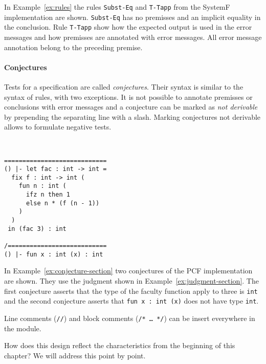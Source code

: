 In Example~\ref{ex:rules} the rules \verb|Subst-Eq| and \verb|T-Tapp|
from the SystemF  implementation are
shown. \verb|Subst-Eq| has no premisses and an implicit equality in
the conclusion. Rule \verb|T-Tapp| show how the expected output is
used in the error messages and how premisses are annotated with error
messages. All error message annotation belong to the preceding
premise.

\paragraph{Conjectures} Tests for a specification are called
\textit{conjectures}. Their syntax is similar to the syntax of rules,
with two exceptions. It is not possible to annotate premisses or
conclusions with error messages and a conjecture can be marked as
\textit{not derivable} by prepending the separating line with a
slash. Marking conjectures not derivable allows to formulate negative
tests.

\begin{example}{~}
\begin{lstlisting}[language=sltc]
============================
() |- let fac : int -> int = 
  fix f : int -> int (
    fun n : int (
      ifz n then 1 
      else n * (f (n - 1))
    )
  )
 in (fac 3) : int

/===========================
() |- fun x : int (x) : int
\end{lstlisting}
\label{ex:conjecture-section}
\end{example}

In Example~\ref{ex:conjecture-section} two conjectures of the PCF
implementation are shown. They use the judgment shown in
Example~\ref{ex:judgment-section}. The first conjecture asserts that
the type of the faculty function apply to three is \verb|int| and the
second conjecture asserts that \verb|fun x : int (x)| does not have
type \verb|int|.

Line comments (\verb|//|) and block comments (\verb|/* … */|) can be
insert everywhere in the module.

How does this design reflect the characteristics from the beginning of
this chapter? We will address this point by point.

